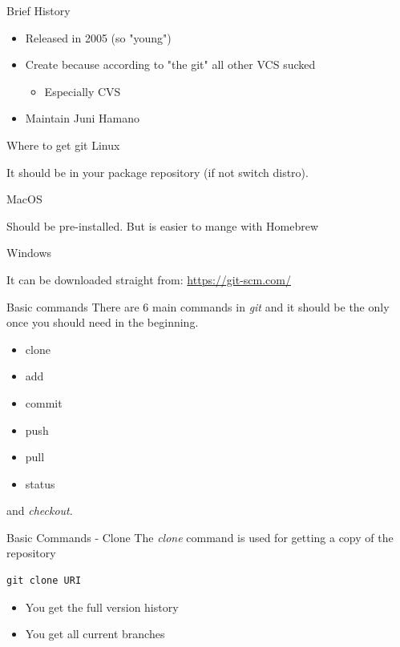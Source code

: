 \documentclass[table,svgnames,aspectratio=169]{beamer}
\begin{document}
\begin{frame}[label={sec:orgf084af8}]{Brief History}
\begin{itemize}
\item Released in 2005 (so "young")
\item Create because according to "the git" all other VCS sucked 
\begin{itemize}
\item Especially CVS
\end{itemize}
\item Maintain Juni Hamano
\end{itemize}
\end{frame}

\begin{frame}[label={sec:orgdf5c308}]{Where to get git}
\alert{Linux}

It should be in your package repository (if not switch distro). 


\alert{MacOS}

Should be pre-installed. But is easier to mange with Homebrew 

\alert{Windows} 

It can be downloaded straight from: \url{https://git-scm.com/} 
\end{frame}


\begin{frame}[label={sec:orge7bb416}]{Basic commands}
There are 6 main commands in \emph{git} and it should be the only once you should need in the beginning. 

\begin{itemize}
\item clone
\item add
\item commit
\item push
\item pull
\item status
\end{itemize}
and \emph{checkout}.
\end{frame}

\begin{frame}[fragile,label={sec:org9107b1f}]{Basic Commands - Clone}
 The \emph{clone} command is used for getting a copy of the repository 

\lstset{language=bash,label= ,caption= ,captionpos=b,numbers=none}
\begin{lstlisting}
git clone URI
\end{lstlisting}

\begin{itemize}
\item You get the full version history
\item You get all current branches
\end{itemize}
\end{frame}
\end{document}
